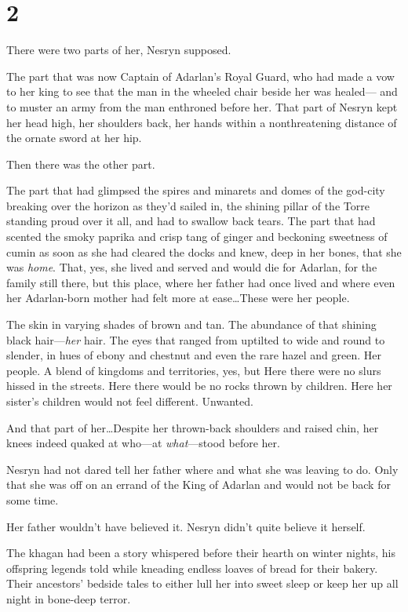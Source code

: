 
\chapter{2}

There were two parts of her, Nesryn supposed.

The part that was now Captain of Adarlan's Royal Guard, who had made a vow to her king to see that the man in the wheeled chair beside her was healed--- and to muster an army from the man enthroned before her. That part of Nesryn kept her head high, her shoulders back, her hands within a nonthreatening distance of the ornate sword at her hip.

Then there was the other part.

The part that had glimpsed the spires and minarets and domes of the god-city breaking over the horizon as they'd sailed in, the shining pillar of the Torre standing proud over it all, and had to swallow back tears. The part that had scented the smoky paprika and crisp tang of ginger and beckoning sweetness of cumin as soon as she had cleared the docks and knew, deep in her bones, that she was \emph{home}. That, yes, she lived and served and would die for Adarlan, for the family still there, but this place, where her father had once lived and where even her Adarlan-born mother had felt more at ease\ldots These were her people.

The skin in varying shades of brown and tan. The abundance of that shining black hair---\emph{her} hair. The eyes that ranged from uptilted to wide and round to slender, in hues of ebony and chestnut and even the rare hazel and green. Her people. A blend of kingdoms and territories, yes, but  Here there were no slurs hissed in the streets. Here there would be no rocks thrown by children. Here her sister's children would not feel different. Unwanted.

And that part of her\ldots Despite her thrown-back shoulders and raised chin, her knees indeed quaked at who---at \emph{what}---stood before her.

Nesryn had not dared tell her father where and what she was leaving to do. Only that she was off on an errand of the King of Adarlan and would not be back for some time.

Her father wouldn't have believed it. Nesryn didn't quite believe it herself.

The khagan had been a story whispered before their hearth on winter nights, his offspring legends told while kneading endless loaves of bread for their bakery. Their ancestors' bedside tales to either lull her into sweet sleep or keep her up all night in bone-deep terror.

